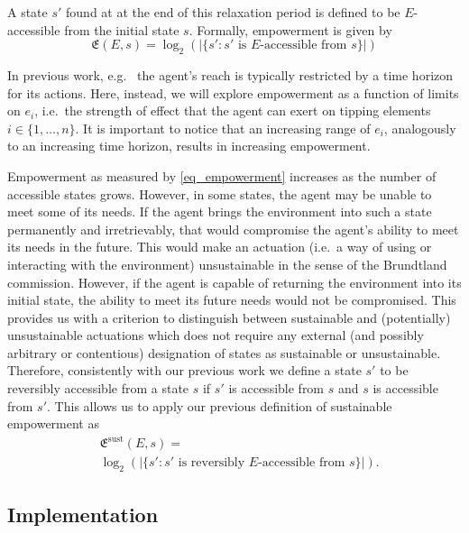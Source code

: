 \documentclass[conference]{IEEEtran}
\newcommand{\agentimpact}{\ensuremath{e}}
\newcommand{\empowerment}{\ensuremath{\mathfrak{E}}}
\newcommand{\sustainableempowerment}{\ensuremath{\empowerment^{\mathrm{sust}}}}
\newcommand{\impactstrength}{\ensuremath{E}}
\begin{document}
A state $s'$ found at at the end of this relaxation period is defined
to be $\impactstrength$-accessible from the initial state $s$. Formally, empowerment
is given by
\begin{equation}
  \label{eq_empowerment}
  \empowerment(E, s) =
  \log_2(|\{s': s' \mbox{ is } E\mbox{-accessible from } s\}|)
\end{equation}

In previous work, e.g.\ \cite{Salge2014_empowermentintro} the agent's
reach is typically restricted by a time horizon for its actions. Here,
instead, we will explore empowerment as a function of limits on
$\agentimpact_i$, i.e.\ the strength of effect that the agent can
exert on tipping elements $i \in \{1, \ldots, n\}$. It is important to
notice that an increasing range of $\agentimpact_i$, analogously to an
increasing time horizon, results in increasing empowerment.

Empowerment as measured by \eqref{eq_empowerment} increases as the
number of accessible states grows. However, in some states, the agent
may be unable to meet some of its needs. If the agent brings the
environment into such a state permanently and irretrievably, that
would compromise the agent's ability to meet its needs in the future.
This would make an actuation (i.e.\ a way of using or interacting with
the environment) unsustainable in the sense of the Brundtland
commission. However, if the agent is capable of returning the
environment into its initial state, the ability to meet its future
needs would not be compromised. This provides us with a criterion to
distinguish between sustainable and (potentially) unsustainable
actuations which does not require any external (and possibly arbitrary
or contentious) designation of states as sustainable or unsustainable.
Therefore, consistently with our previous work we define a state $s'$
to be reversibly accessible from a state $s$ if $s'$ is accessible
from $s$ and $s$ is accessible from $s'$. This allows us to apply our
previous definition of sustainable empowerment as
\begin{equation}
  \label{eq_sustainableempowerment}
  \begin{aligned}
    & \sustainableempowerment(E, s) = \\
    & \log_2(|\{s': s' \mbox{ is
      reversibly } E\mbox{-accessible from } s\}|).
  \end{aligned}
\end{equation}


\subsection{Implementation}
\end{document}
